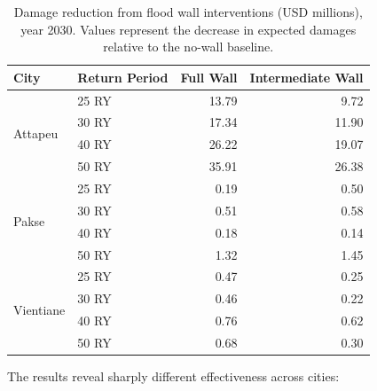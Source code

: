 \documentclass[11pt,a4paper]{article}
\begin{document}
\begin{table}[H]
  \centering
  \caption{Damage reduction from flood wall interventions (USD millions), year 2030. Values represent the decrease in expected damages relative to the no-wall baseline.}
  \label{tab:wall_reduction}
  \small
  \begin{tabular}{llrr}
    \toprule
    \textbf{City} & \textbf{Return Period} & \textbf{Full Wall} & \textbf{Intermediate Wall} \\
    \midrule
    \multirow{4}{*}{Attapeu}   & 25 RY & 13.79 &  9.72 \\
                               & 30 RY & 17.34 & 11.90 \\
                               & 40 RY & 26.22 & 19.07 \\
                               & 50 RY & 35.91 & 26.38 \\
    \midrule
    \multirow{4}{*}{Pakse}     & 25 RY &  0.19 &  0.50 \\
                               & 30 RY &  0.51 &  0.58 \\
                               & 40 RY &  0.18 &  0.14 \\
                               & 50 RY &  1.32 &  1.45 \\
    \midrule
    \multirow{4}{*}{Vientiane} & 25 RY &  0.47 &  0.25 \\
                               & 30 RY &  0.46 &  0.22 \\
                               & 40 RY &  0.76 &  0.62 \\
                               & 50 RY &  0.68 &  0.30 \\
    \bottomrule
  \end{tabular}
\end{table}

The results reveal sharply different effectiveness across cities:
\end{document}
